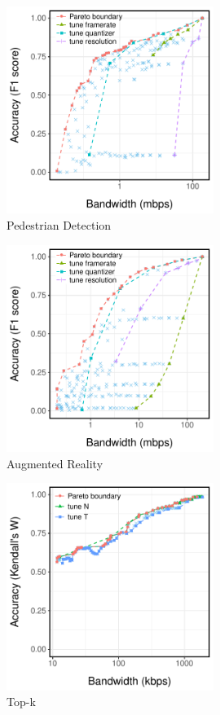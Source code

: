 \begin{figure}
  \centering
  \includegraphics[width=0.6\textwidth]{figures/ped-profile.pdf}
  \caption{Pedestrian Detection}
  \label{fig:pd-profile}
\end{figure}

\begin{figure}
  \centering
  \includegraphics[width=0.6\textwidth]{figures/darknet-profile.pdf}
  \caption{Augmented Reality}
  \label{fig:ar-profile}
\end{figure}

\begin{figure}
  \centering
  \includegraphics[width=0.6\textwidth]{figures/log-profile.pdf}
  \caption{Top-k}
  \label{fig:tk-profile}
\end{figure}

